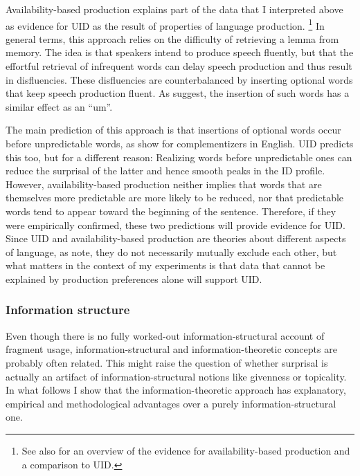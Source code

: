 Availability-based production \citep[e.g.][]{bock1987, ferreira.dell2000} explains part of the data that I interpreted above as evidence for UID as the result of properties of language production.%
%
\footnote{See also \citet{jaeger.buz2017} for an overview of the evidence for availability-based production and a comparison to UID.}\afterfn%
% 
In general terms, this approach relies on the difficulty of retrieving a lemma from memory. The idea is that speakers intend to produce speech fluently, but that the effortful retrieval of infrequent words can delay speech production and thus result in disfluencies. These disfluencies are counterbalanced by inserting optional words that keep speech production fluent. As \citet[299]{ferreira.dell2000} suggest, the insertion of such words has a similar effect as an ``um''.

The main prediction of this approach is that insertions of optional words occur before unpredictable words, as \citet{ferreira.dell2000} show for complementizers in English. UID predicts this too, but for a different reason: Realizing words before unpredictable ones can reduce the surprisal of the latter and hence smooth peaks in the ID profile. However, availability-based production neither implies that words that are themselves more predictable are more likely to be reduced, nor that predictable words tend to appear toward the beginning of the sentence. Therefore, if they were empirically confirmed, these two predictions will provide evidence for UID. Since UID and availability-based production are theories about different aspects of language, as \citet{jaeger.buz2017} note, they do not necessarily mutually exclude each other, but what matters in the context of my experiments is that data that cannot be explained by production preferences alone will support UID.

\subsubsection{Information structure}
Even though there is no fully worked-out information-structural account of fragment usage, information-structural and information-theoretic concepts are probably often related. This might raise the question of whether surprisal is actually an artifact of information-structural notions like givenness or topicality. In what follows I show that the information-theoretic approach has explanatory, empirical and methodological advantages over a purely information-structural one.

